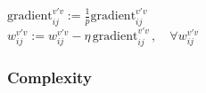 \begin{frame}
{{            }
			$\text{gradient}_{ij}^{v'v} := \frac{1}{p} \text{gradient}_{ij}^{v'v}$\\
			 $w_{ij}^{v'v} := w_{ij}^{v'v} - \eta
					\, \text{gradient}_{ij}^{v'v} 
					\,, \quad \forall w_{ij}^{v'v}	$
					\vspace{-1.5mm}
		}
\end{frame}

\subsubsection{Complexity}

